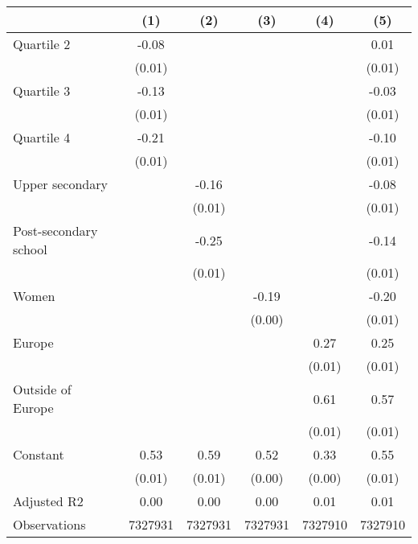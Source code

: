 
\begin{tabular}{@{}l*{5}{S[table-format={-}2.2{\tnote{***}}]}@{}}
\toprule
{} & {(1)} & {(2)} & {(3)} & {(4)} & {(5)}\tabularnewline%
\midrule
Quartile 2 & -0.08\tnote{***} &  &  &  & 0.01\tabularnewline%
 & (0.01) &  &  &  & \vphantom{2} (0.01)\tabularnewline%
Quartile 3 & -0.13\tnote{***} &  &  &  & -0.03\tnote{***}\tabularnewline%
 & (0.01) &  &  &  & \vphantom{1} (0.01)\tabularnewline%
Quartile 4 & -0.21\tnote{***} &  &  &  & -0.10\tnote{***}\tabularnewline%
 & (0.01) &  &  &  & (0.01)\tabularnewline%
Upper secondary &  & -0.16\tnote{***} &  &  & -0.08\tnote{***}\tabularnewline%
 &  & (0.01) &  &  & \vphantom{1} (0.01)\tabularnewline%
Post-secondary school &  & -0.25\tnote{***} &  &  & -0.14\tnote{***}\tabularnewline%
 &  & (0.01) &  &  & (0.01)\tabularnewline%
Women &  &  & -0.19\tnote{***} &  & -0.20\tnote{***}\tabularnewline%
 &  &  & (0.00) &  & (0.01)\tabularnewline%
Europe &  &  &  & 0.27\tnote{***} & 0.25\tnote{***}\tabularnewline%
 &  &  &  & (0.01) & \vphantom{1} (0.01)\tabularnewline%
Outside of Europe &  &  &  & 0.61\tnote{***} & 0.57\tnote{***}\tabularnewline%
 &  &  &  & (0.01) & (0.01)\tabularnewline%
Constant & 0.53\tnote{***} & 0.59\tnote{***} & 0.52\tnote{***} & 0.33\tnote{***} & 0.55\tnote{***}\tabularnewline%
 & (0.01) & (0.01) & (0.00) & (0.00) & (0.01)\tabularnewline%
\midrule
Adjusted R2 & 0.00 & 0.00 & 0.00 & 0.01 & 0.01\tabularnewline%
Observations & {\num{7327931}} & {\num{7327931}} & {\num{7327931}} & {\num{7327910}} & {\num{7327910}}\tabularnewline%
\bottomrule
\end{tabular}
